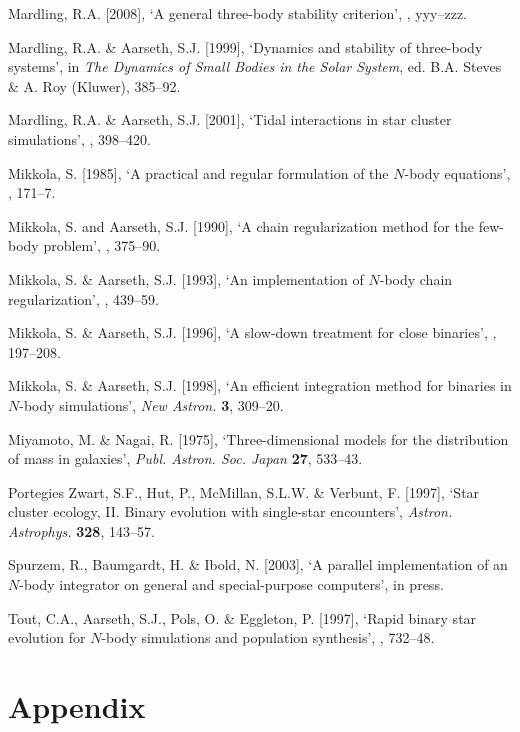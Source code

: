 \documentclass[12pt]{article}
\begin{document}
\medskip
\noindent
Mardling, R.A. [2008], `A general three-body stability criterion', , yyy--zzz.

\medskip
\noindent
Mardling, R.A. \& Aarseth, S.J. [1999], `Dynamics and stability of three-body systems',
in {\it The Dynamics of Small Bodies in the Solar System}, ed. B.A. Steves \& A. Roy
(Kluwer), 385--92.

\medskip
\noindent
Mardling, R.A. \& Aarseth, S.J. [2001], `Tidal interactions in star cluster simulations',
, 398--420.

\medskip
\noindent
Mikkola, S. [1985], `A practical and regular formulation of the $N$-body equations',
, 171--7.

\medskip
\noindent
Mikkola, S. and Aarseth, S.J. [1990], `A chain regularization method for the
few-body problem',
, 375--90.

\medskip
\noindent
Mikkola, S. \& Aarseth, S.J. [1993], `An implementation of $N$-body chain
\hbox{regularization',}
, 439--59.

\medskip
\noindent
Mikkola, S. \& Aarseth, S.J. [1996], `A slow-down treatment for close binaries',
, 197--208.

\medskip
\noindent
Mikkola, S. \& Aarseth, S.J. [1998], `An efficient integration method for
binaries in $N$-body simulations',
{\it New Astron.} {\bf 3}, 309--20.

\medskip
\noindent
Miyamoto, M. \& Nagai, R. [1975], `Three-dimensional models for the distribution
of mass in galaxies', {\it Publ. Astron. Soc. Japan} {\bf 27}, 533--43.

\medskip
\noindent
Portegies Zwart, S.F., Hut, P., McMillan, S.L.W. \& Verbunt, F. [1997],
`Star cluster ecology, II. Binary evolution with single-star encounters',
{\it Astron. Astrophys.} {\bf 328}, 143--57.

\medskip
\noindent
Spurzem, R., Baumgardt, H. \& Ibold, N. [2003], `A parallel implementation of an
$N$-body integrator on general and special-purpose computers',
\MN in press.

\medskip
\noindent
Tout, C.A., Aarseth, S.J., Pols, O. \& Eggleton, P. [1997], `Rapid binary
star evolution for $N$-body simulations and population synthesis',
, 732--48.

\newpage

\section{Appendix}
\end{document}
